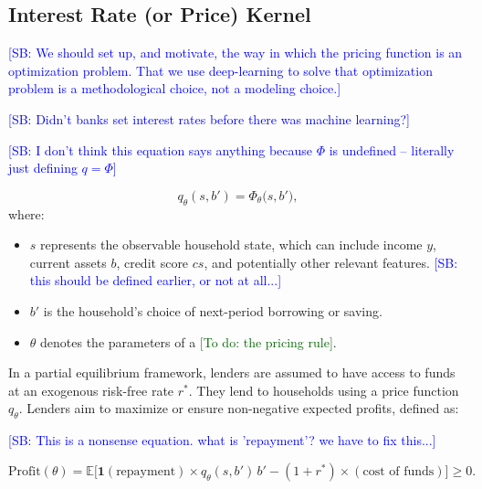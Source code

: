 \documentclass[acmsmall]{acmart}
\newcommand{\todo}[1]{\textcolor{DarkGreen}{[To do: #1]}}
\newcommand{\spb}[1]{\textcolor{blue}{[SB: #1]}}
\begin{document}
\subsection{Interest Rate (or Price) Kernel}

\spb{We should set up, and motivate, the way in which the pricing function is an optimization problem. That we use deep-learning to solve that optimization problem is a methodological choice, not a modeling choice.}


\spb{Didn't banks set interest rates before there was machine learning?}

\spb{I don't think this equation says anything because $\Phi$ is undefined -- literally just defining $q = \Phi$}

\begin{equation}
q_\theta(s, b') = \Phi_\theta\bigl(s, b'\bigr),
\end{equation}
where:
\begin{itemize}
    \item $s$ represents the observable household state, which can include income $y$, current assets $b$, credit score $cs$, and potentially other relevant features. \spb{this should be defined earlier, or not at all...}
    \item $b'$ is the household's choice of next-period borrowing or saving.
    \item $\theta$ denotes the parameters of a \todo{the pricing rule}.
\end{itemize}


In a partial equilibrium framework, lenders are assumed to have access to funds at an exogenous risk-free rate $r^*$. They lend to households using a price function $q_\theta$. Lenders aim to maximize or ensure non-negative expected profits, defined as:

\spb{This is a nonsense equation. what is 'repayment'? we have to fix this...}

\begin{equation}
\text{Profit}(\theta) = \mathbb{E}\bigl[
   \mathbf{1}(\text{repayment}) \times q_\theta(s,b')\,b'
   - (1+r^*)\times(\text{cost of funds})
\bigr] \ge 0.
\end{equation}
\end{document}
